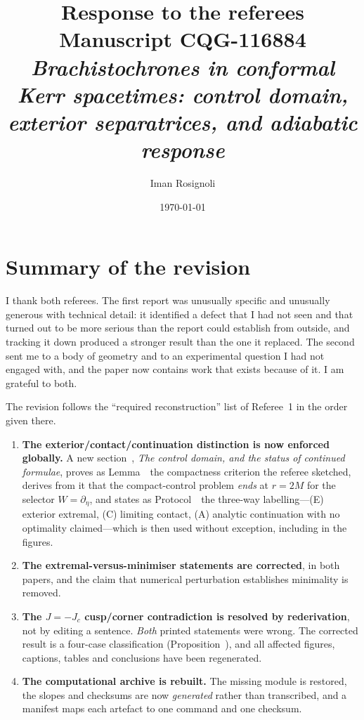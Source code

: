\documentclass[11pt]{article}
\title{\vspace{-1.6cm}Response to the referees\\[2pt]
\large Manuscript CQG-116884\\[2pt]
\normalsize\emph{Brachistochrones in conformal Kerr spacetimes:
control domain, exterior separatrices, and adiabatic response}}
\author{Iman Rosignoli}
\date{\today}
\begin{document}
\maketitle
\thispagestyle{empty}

\section*{Summary of the revision}

I thank both referees. The first report was unusually specific and unusually
generous with technical detail: it identified a defect that I had not seen and that
turned out to be more serious than the report could establish from outside, and
tracking it down produced a stronger result than the one it replaced. The second
sent me to a body of geometry and to an experimental question I had not engaged
with, and the paper now contains work that exists because of it. I am grateful to
both.

The revision follows the ``required reconstruction'' list of Referee~1 in the
order given there.

\begin{enumerate}[leftmargin=1.4em,itemsep=2pt]
\item \textbf{The exterior/contact/continuation distinction is now enforced
globally.} A new section~\msSecDomain, \emph{The control domain, and the status of
continued formulae}, proves as Lemma~\msLemCompact\ the compactness criterion the referee
sketched, derives from it that the compact-control problem \emph{ends} at
$r=2M$ for the selector $W=\partial_\eta$, and states as Protocol~\msProtStatus\ the
three-way labelling---(E) exterior extremal, (C) limiting contact, (A) analytic
continuation with no optimality claimed---which is then used without exception,
including in the figures.

\item \textbf{The extremal-versus-minimiser statements are corrected}, in both
papers, and the claim that numerical perturbation establishes minimality is
removed.

\item \textbf{The $J=-J_c$ cusp/corner contradiction is resolved by
rederivation}, not by editing a sentence. \emph{Both} printed statements were
wrong. The corrected result is a four-case classification
(Proposition~\msPropClassification), and all affected figures, captions, tables and conclusions
have been regenerated.

\item \textbf{The computational archive is rebuilt.} The missing module is
restored, the slopes and checksums are now \emph{generated} rather than
transcribed, and a manifest maps each artefact to one command and one checksum.
\end{enumerate}
\end{document}
